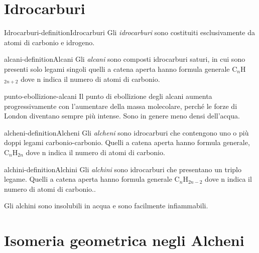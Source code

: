 \documentclass[preview]{standalone}
\begin{document}
\genpage

\section{Idrocarburi}

\begin{snippetdefinition}{Idrocarburi-definition}{Idrocarburi}
    Gli \textit{idrocarburi} sono costituiti esclusivamente da atomi di
    carbonio e idrogeno.
\end{snippetdefinition}

\begin{snippetdefinition}{alcani-definition}{Alcani}
    Gli \textit{alcani} sono composti idrocarburi saturi, in cui sono presenti solo
    legami singoli quelli a catena aperta hanno formula generale
    C\({}_n\)H\({}_{2n+2}\) dove n indica il numero di atomi di carbonio.
\end{snippetdefinition}

\begin{snippet}{punto-ebollizione-alcani}
    Il punto di ebollizione degli alcani aumenta progressivamente con
    l'aumentare della massa molecolare, perché le forze di London
    diventano sempre più intense. Sono in genere meno densi
    dell'acqua.
\end{snippet}

\begin{snippetdefinition}{alcheni-definition}{Alcheni}
    Gli \textit{alcheni} sono idrocarburi che contengono uno o più doppi
    legami carbonio-carbonio.
    Quelli a catena aperta hanno formula generale, C\({}_n\)H\({}_{2n}\)
    dove n indica il numero di atomi di carbonio.
\end{snippetdefinition}

\begin{snippetdefinition}{alchini-definition}{Alchini}
    Gli \textit{alchini} sono idrocarburi che presentano un triplo legame. Quelli a catena
    aperta hanno formula generale C\({}_n\)H\({}_{2n-2}\)
    dove n indica il numero di atomi di carbonio.. 
\end{snippetdefinition}

\begin{plainhtml}
    Gli alchini sono insolubili in acqua e sono facilmente infiammabili.
\end{plainhtml}

\section{Isomeria geometrica negli Alcheni}
\end{document}
